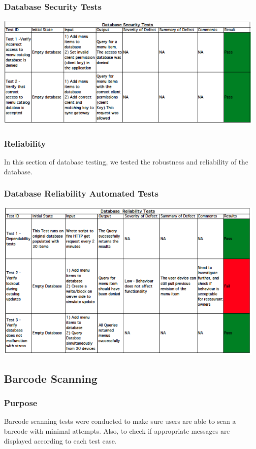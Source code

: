 \documentclass[12pt, titlepage]{article}
\begin{document}
\subsubsection{Database Security Tests }
\includegraphics[width=\textwidth,height=\textheight,keepaspectratio]{security_tests.png}

\subsubsection{Reliability}
In this section of database testing, we tested the robustness and reliability of the database. 
\subsubsection{Database Reliability Automated Tests }
\includegraphics[width=\textwidth,height=\textheight,keepaspectratio]{reliability_tests.png}


\subsection{Barcode Scanning}

\subsubsection{Purpose}
Barcode scanning tests were conducted to make sure users are able to scan a barcode with minimal attempts. Also, to check if appropriate messages are displayed according to each test case.
\end{document}
